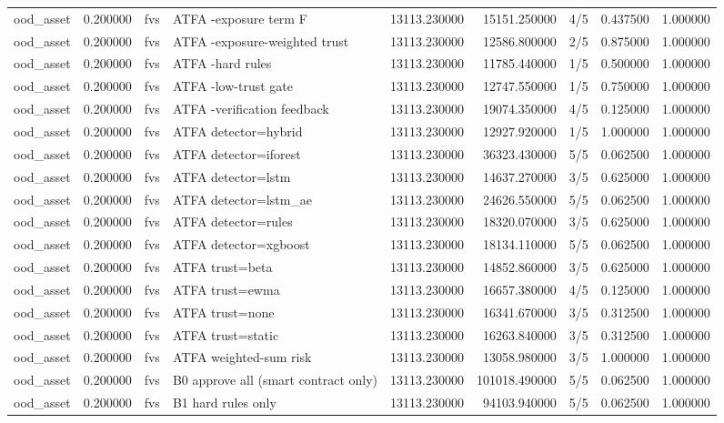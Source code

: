 \begin{tabular}{lrllrrlrr}
ood\_asset & 0.200000 & fvs & ATFA -exposure term F & 13113.230000 & 15151.250000 & 4/5 & 0.437500 & 1.000000 \\
ood\_asset & 0.200000 & fvs & ATFA -exposure-weighted trust & 13113.230000 & 12586.800000 & 2/5 & 0.875000 & 1.000000 \\
ood\_asset & 0.200000 & fvs & ATFA -hard rules & 13113.230000 & 11785.440000 & 1/5 & 0.500000 & 1.000000 \\
ood\_asset & 0.200000 & fvs & ATFA -low-trust gate & 13113.230000 & 12747.550000 & 1/5 & 0.750000 & 1.000000 \\
ood\_asset & 0.200000 & fvs & ATFA -verification feedback & 13113.230000 & 19074.350000 & 4/5 & 0.125000 & 1.000000 \\
ood\_asset & 0.200000 & fvs & ATFA detector=hybrid & 13113.230000 & 12927.920000 & 1/5 & 1.000000 & 1.000000 \\
ood\_asset & 0.200000 & fvs & ATFA detector=iforest & 13113.230000 & 36323.430000 & 5/5 & 0.062500 & 1.000000 \\
ood\_asset & 0.200000 & fvs & ATFA detector=lstm & 13113.230000 & 14637.270000 & 3/5 & 0.625000 & 1.000000 \\
ood\_asset & 0.200000 & fvs & ATFA detector=lstm\_ae & 13113.230000 & 24626.550000 & 5/5 & 0.062500 & 1.000000 \\
ood\_asset & 0.200000 & fvs & ATFA detector=rules & 13113.230000 & 18320.070000 & 3/5 & 0.625000 & 1.000000 \\
ood\_asset & 0.200000 & fvs & ATFA detector=xgboost & 13113.230000 & 18134.110000 & 5/5 & 0.062500 & 1.000000 \\
ood\_asset & 0.200000 & fvs & ATFA trust=beta & 13113.230000 & 14852.860000 & 3/5 & 0.625000 & 1.000000 \\
ood\_asset & 0.200000 & fvs & ATFA trust=ewma & 13113.230000 & 16657.380000 & 4/5 & 0.125000 & 1.000000 \\
ood\_asset & 0.200000 & fvs & ATFA trust=none & 13113.230000 & 16341.670000 & 3/5 & 0.312500 & 1.000000 \\
ood\_asset & 0.200000 & fvs & ATFA trust=static & 13113.230000 & 16263.840000 & 3/5 & 0.312500 & 1.000000 \\
ood\_asset & 0.200000 & fvs & ATFA weighted-sum risk & 13113.230000 & 13058.980000 & 3/5 & 1.000000 & 1.000000 \\
ood\_asset & 0.200000 & fvs & B0 approve all (smart contract only) & 13113.230000 & 101018.490000 & 5/5 & 0.062500 & 1.000000 \\
ood\_asset & 0.200000 & fvs & B1 hard rules only & 13113.230000 & 94103.940000 & 5/5 & 0.062500 & 1.000000 \\

\end{tabular}
